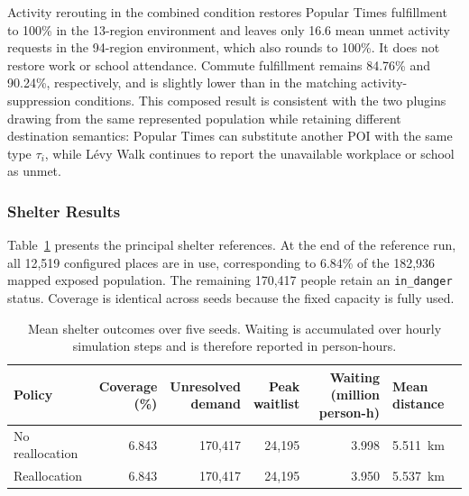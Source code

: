 Activity rerouting in the combined condition restores Popular Times fulfillment to 100\% in the 13-region environment and leaves only 16.6 mean unmet activity requests in the 94-region environment, which also rounds to 100\%. It does not restore work or school attendance. Commute fulfillment remains 84.76\% and 90.24\%, respectively, and is slightly lower than in the matching activity-suppression conditions. This composed result is consistent with the two plugins drawing from the same represented population while retaining different destination semantics: Popular Times can substitute another POI with the same type $\tau_i$, while L\'evy Walk continues to report the unavailable workplace or school as unmet.



\subsubsection{Shelter Results}

Table~\ref{tbl:shelter_reference_results} presents the principal shelter references. At the end of the reference run, all 12,519 configured places are in use, corresponding to 6.84\% of the 182,936 mapped exposed population. The remaining 170,417 people retain an \texttt{in\_danger} status. Coverage is identical across seeds because the fixed capacity is fully used.

\begin{table}[ht]
\centering
\footnotesize
\caption{Mean shelter outcomes over five seeds. Waiting is accumulated over hourly simulation steps and is therefore reported in person-hours.}
\label{tbl:shelter_reference_results}
\begin{tabularx}{\linewidth}{@{}lrrrrX@{}}
\toprule
\textbf{Policy} &
\shortstack{\textbf{Coverage}\\\textbf{(\%)}} &
\shortstack{\textbf{Unresolved}\\\textbf{demand}} &
\shortstack{\textbf{Peak}\\\textbf{waitlist}} &
\shortstack{\textbf{Waiting}\\\textbf{(million person-h)}} &
\textbf{Mean distance} \\
\midrule
No reallocation
    & 6.843 & 170,417 & 24,195 & 3.998 & 5.511~km \\
Reallocation
    & 6.843 & 170,417 & 24,195 & 3.950 & 5.537~km \\
\bottomrule
\end{tabularx}
\end{table}


